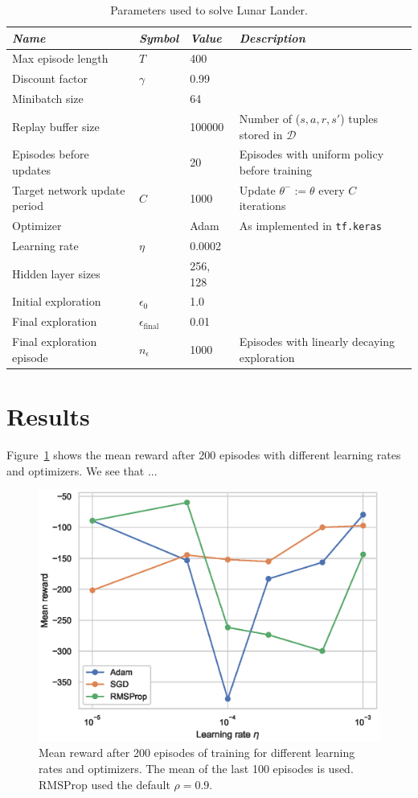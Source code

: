 \documentclass{article}
\begin{document}
\begin{table}[t]
  \centering
  \caption{Parameters used to solve Lunar Lander.}
  \label{tbl:params}
\begin{tabular}{*4l} \toprule
\emph{Name}       & \emph{Symbol} & \emph{Value} & \emph{Description} \\ \midrule
Max episode length                 & $T$ & 400 & \\
Discount factor & $\gamma$ & 0.99   & \\
Minibatch size &  & 64 & \\
Replay buffer size & & 100000 & Number of ($s,a,r,s'$) tuples stored in $\mathcal{D}$ \\
Episodes before updates & & 20 & Episodes with uniform policy before training \\
Target network update period & $C$ & 1000 & Update $\theta^{-} := \theta$ every $C$ iterations \\
Optimizer & & Adam & As implemented in \texttt{tf.keras} \\
Learning rate & $\eta$ & 0.0002 & \\
Hidden layer sizes & & 256, 128 & \\
Initial exploration & $\epsilon_0$ & 1.0 & \\
Final exploration & $\epsilon_{\text{final}}$ & 0.01 & \\
Final exploration episode & $n_\epsilon$ & 1000 & Episodes with linearly decaying exploration \\ \bottomrule
\end{tabular}
\end{table}

\section{Results}
\label{results}
Figure~\ref{fig:lr} shows the mean reward after 200 episodes with different learning rates and optimizers. We see that ...

\begin{figure}[tb]
  \includegraphics[width=\linewidth]{figures/learning_rate.eps}
  \caption{Mean reward after 200 episodes of training for different learning rates and optimizers. The mean of the last 100 episodes is used. RMSProp used the default $\rho = 0.9$.}
  \label{fig:lr}
\end{figure}
\end{document}
